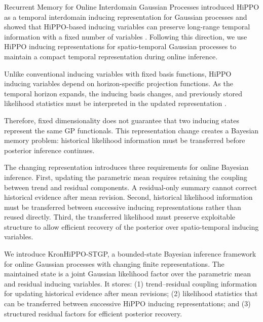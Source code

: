 \documentclass[twoside]{article}
\newcommand{\method}{KronHiPPO-STGP\xspace}
\begin{document}
Recurrent Memory for Online Interdomain Gaussian Processes introduced HiPPO as a temporal interdomain inducing representation for Gaussian processes and showed that HiPPO-based inducing variables can preserve long-range temporal information with a fixed number of variables \citep{Chen2025}. Following this direction, we use HiPPO inducing representations for spatio-temporal Gaussian processes to maintain a compact temporal representation during online inference.

Unlike conventional inducing variables with fixed basis functions, HiPPO inducing variables depend on horizon-specific projection functions. As the temporal horizon expands, the inducing basis changes, and previously stored likelihood statistics must be interpreted in the updated representation \citep{Gu2020,Chen2025}.

Therefore, fixed dimensionality does not guarantee that two inducing states represent the same GP functionals. This representation change creates a Bayesian memory problem: historical likelihood information must be transferred before posterior inference continues.

The changing representation introduces three requirements for online Bayesian inference. First, updating the parametric mean requires retaining the coupling between trend and residual components. A residual-only summary cannot correct historical evidence after mean revision. Second, historical likelihood information must be transferred between successive inducing representations rather than reused directly. Third, the transferred likelihood must preserve exploitable structure to allow efficient recovery of the posterior over spatio-temporal inducing variables.

We introduce \method, a bounded-state Bayesian inference framework for online Gaussian processes with changing finite representations. The maintained state is a joint Gaussian likelihood factor over the parametric mean and residual inducing variables. It stores: (1) trend--residual coupling information for updating historical evidence after mean revisions; (2) likelihood statistics that can be transferred between successive HiPPO inducing representations; and (3) structured residual factors for efficient posterior recovery.
\end{document}
